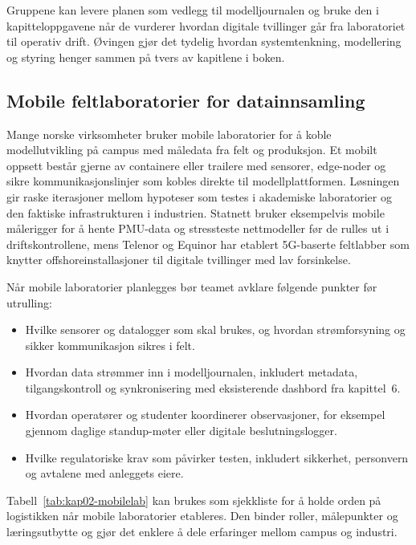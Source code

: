 Gruppene kan levere planen som vedlegg til modelljournalen og bruke den i kapitteloppgavene når de vurderer hvordan digitale tvillinger går fra laboratoriet til operativ drift. Øvingen gjør det tydelig hvordan systemtenkning, modellering og styring henger sammen på tvers av kapitlene i boken.

\subsection{Mobile feltlaboratorier for datainnsamling}
Mange norske virksomheter bruker mobile laboratorier for å koble modellutvikling på campus med måledata fra felt og produksjon. Et mobilt oppsett består gjerne av containere eller trailere med sensorer, edge-noder og sikre kommunikasjonslinjer som kobles direkte til modellplattformen. Løsningen gir raske iterasjoner mellom hypoteser som testes i akademiske laboratorier og den faktiske infrastrukturen i industrien. Statnett bruker eksempelvis mobile målerigger for å hente PMU-data og stressteste nettmodeller før de rulles ut i driftskontrollene, mens Telenor og Equinor har etablert 5G-baserte feltlabber som knytter offshoreinstallasjoner til digitale tvillinger med lav forsinkelse.\citep{statnett2023digital,telenor2021equinor5g}

Når mobile laboratorier planlegges bør teamet avklare følgende punkter før utrulling:
\begin{itemize}
    \item Hvilke sensorer og datalogger som skal brukes, og hvordan strømforsyning og sikker kommunikasjon sikres i felt.
    \item Hvordan data strømmer inn i modelljournalen, inkludert metadata, tilgangskontroll og synkronisering med eksisterende dashbord fra kapittel~6.
    \item Hvordan operatører og studenter koordinerer observasjoner, for eksempel gjennom daglige standup-møter eller digitale beslutningslogger.
    \item Hvilke regulatoriske krav som påvirker testen, inkludert sikkerhet, personvern og avtalene med anleggets eiere.\citep{dnv2023digitalassurance,digdir2023styringai}
\end{itemize}

Tabell~\ref{tab:kap02-mobilelab} kan brukes som sjekkliste for å holde orden på logistikken når mobile laboratorier etableres. Den binder roller, målepunkter og læringsutbytte og gjør det enklere å dele erfaringer mellom campus og industri.

